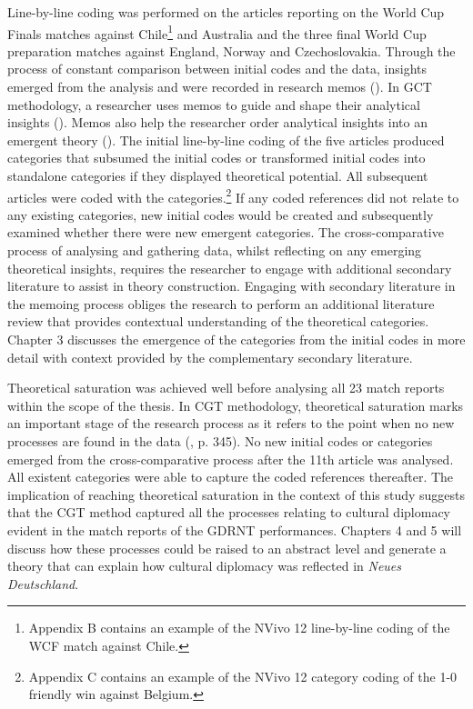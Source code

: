 Line-by-line coding was performed on the articles reporting on the World Cup Finals matches against Chile\footnote{Appendix B contains an example of the NVivo 12 line-by-line coding of the WCF match against Chile.} and Australia and the three final World Cup preparation matches against England, Norway and Czechoslovakia. Through the process of constant comparison between initial codes and the data, insights emerged from the analysis and were recorded in research memos (\cite{charmaz2014}). In GCT methodology, a researcher uses memos to guide and shape their analytical insights (\cite{charmaz2014}). Memos also help the researcher order analytical insights into an emergent theory (\cite{charmaz2014}). The initial line-by-line coding of the five articles produced categories that subsumed the initial codes or transformed initial codes into standalone categories if they displayed theoretical potential. All subsequent articles were coded with the categories.\footnote{Appendix C contains an example of the NVivo 12 category coding of the 1-0 friendly win against Belgium.} If any coded references did not relate to any existing categories, new initial codes would be created and subsequently examined whether there were new emergent categories. The cross-comparative process of analysing and gathering data, whilst reflecting on any emerging theoretical insights, requires the researcher to engage with additional secondary literature to assist in theory construction. Engaging with secondary literature in the memoing process obliges the research to perform an additional literature review that provides contextual understanding of the theoretical categories. Chapter 3 discusses the emergence of the categories from the initial codes in more detail with context provided by the complementary secondary literature.

Theoretical saturation was achieved well before analysing all 23 match reports within the scope of the thesis. In CGT methodology, theoretical saturation marks an important stage of the research process as it refers to the point when no new processes are found in the data (\cite{charmaz2014}, p. 345). No new initial codes or categories emerged from the cross-comparative process after the 11th article was analysed. All existent categories were able to capture the coded references thereafter. The implication of reaching theoretical saturation in the context of this study suggests that the CGT method captured all the processes relating to cultural diplomacy evident in the match reports of the GDRNT performances. Chapters 4 and 5 will discuss how these processes could be raised to an abstract level and generate a theory that can explain how cultural diplomacy was reflected in \textit{Neues Deutschland}. 
